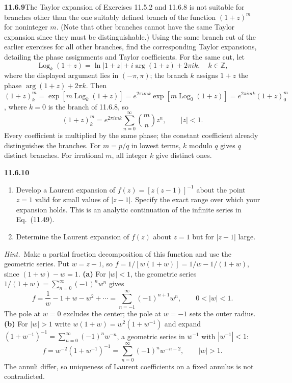 \par\bigskip
\noindent\textbf{11.6.9}\quad The Taylor expansion of Exercises 11.5.2 and
11.6.8 is not suitable for branches other than the one suitably defined
branch of the function $(1+z)^{m}$ for noninteger $m$. (Note that other
branches cannot have the same Taylor expansion since they must be
distinguishable.) Using the same branch cut of the earlier exercises for all
other branches, find the corresponding Taylor expansions, detailing the phase
assignments and Taylor coefficients.
\solution
For the same cut, let
\[
\operatorname{Log}_k(1+z)=\ln|1+z|
+i\arg(1+z)+2\pi ik,\quad k\in\mathbb Z,
\]
where the displayed argument lies in $(-\pi,\pi)$; the branch $k$
assigns $1+z$ the phase $\arg(1+z)+2\pi k$. Then
$(1+z)^m_k=\exp[m\operatorname{Log}_k(1+z)]
=e^{2\pi imk}\exp[m\operatorname{Log}_0(1+z)]=e^{2\pi imk}(1+z)^m_0$,
where $k=0$ is the branch of 11.6.8, so
\[
\boxed{(1+z)^m_k=e^{2\pi imk}
\sum_{n=0}^\infty\binom mn z^n,\qquad |z|<1}.
\]
Every coefficient is multiplied by the same phase; the constant
coefficient already distinguishes the branches.
For $m=p/q$ in lowest terms, $k$ modulo $q$ gives $q$ distinct
branches. For irrational $m$, all integer $k$ give distinct ones.

\par\bigskip
\noindent\textbf{11.6.10}\quad
\begin{enumerate}
\item[(a)] Develop a Laurent expansion of $f(z)=[z(z-1)]^{-1}$ about the
  point $z=1$ valid for small values of $|z-1|$. Specify the exact range over
  which your expansion holds. This is an analytic continuation of the
  infinite series in Eq.~(11.49).
\item[(b)] Determine the Laurent expansion of $f(z)$ about $z=1$ but for
  $|z-1|$ large.
\end{enumerate}
\emph{Hint.}~Make a partial fraction decomposition of this function and use
the geometric series.
\solution
Put $w=z-1$, so $f=1/[w(1+w)]=1/w-1/(1+w)$, since $(1+w)-w=1$.
\textbf{(a)} For $|w|<1$, the geometric series
$1/(1+w)=\sum_{n=0}^\infty(-1)^nw^n$ gives
\[
\boxed{f=\frac1w-1+w-w^2+\cdots
=\sum_{n=-1}^\infty(-1)^{n+1}w^n,\qquad0<|w|<1}.
\]
The pole at $w=0$ excludes the center; the pole at $w=-1$
sets the outer radius.
\textbf{(b)} For $|w|>1$ write $w(1+w)=w^2(1+w^{-1})$ and expand
$(1+w^{-1})^{-1}=\sum_{n=0}^\infty(-1)^nw^{-n}$, a geometric series in
$w^{-1}$ with $|w^{-1}|<1$:
\[
\boxed{f=w^{-2}(1+w^{-1})^{-1}
=\sum_{n=0}^\infty(-1)^nw^{-n-2},\qquad |w|>1}.
\]
The annuli differ, so uniqueness of Laurent coefficients on a
fixed annulus is not contradicted.

